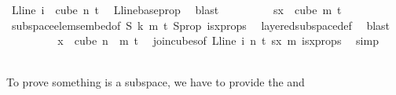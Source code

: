 \begin{isabellebody}
\ {\isachardoublequoteopen}L{\isacharunderscore}{\kern0pt}line\ i\ {\isasymin}\ cube\ n\ {\isacharparenleft}{\kern0pt}t{\isacharplus}{\kern0pt}{}{\isacharparenright}{\kern0pt}{\isachardoublequoteclose}\ \isamarkupfalse%
\ L{\isacharunderscore}{\kern0pt}line{\isacharunderscore}{\kern0pt}base{\isacharunderscore}{\kern0pt}prop\ \isamarkupfalse%
\ blast\isanewline
\ \ \ \ \ \ \isamarkupfalse%
\ \isamarkupfalse%
\ {\isachardoublequoteopen}sx\ {\isasymin}\ cube\ m\ {\isacharparenleft}{\kern0pt}t{\isacharplus}{\kern0pt}{}{\isacharparenright}{\kern0pt}{\isachardoublequoteclose}\ \isanewline
\ \ \ \ \ \ \ \ \isamarkupfalse%
\ subspace{\isacharunderscore}{\kern0pt}elems{\isacharunderscore}{\kern0pt}embed{\isacharbrackleft}{\kern0pt}of\ {\isachardoublequoteopen}S{\isachardoublequoteclose}\ {\isachardoublequoteopen}k{\isachardoublequoteclose}\ {\isachardoublequoteopen}m{\isachardoublequoteclose}\ {\isachardoublequoteopen}t{\isacharplus}{\kern0pt}{}{\isachardoublequoteclose}{\isacharbrackright}{\kern0pt}\ S{\isacharunderscore}{\kern0pt}prop\ isx{\isacharunderscore}{\kern0pt}props\ \isamarkupfalse%
\ layered{\isacharunderscore}{\kern0pt}subspace{\isacharunderscore}{\kern0pt}def\ \isamarkupfalse%
\ blast\isanewline
\ \ \ \ \ \ \isamarkupfalse%
\ \isamarkupfalse%
\ {\isachardoublequoteopen}x\ {\isasymin}\ cube\ {\isacharparenleft}{\kern0pt}n\ {\isacharplus}{\kern0pt}\ m{\isacharparenright}{\kern0pt}\ {\isacharparenleft}{\kern0pt}t{\isacharplus}{\kern0pt}{}{\isacharparenright}{\kern0pt}{\isachardoublequoteclose}\ \isamarkupfalse%
\ join{\isacharunderscore}{\kern0pt}cubes{\isacharbrackleft}{\kern0pt}of\ {\isachardoublequoteopen}L{\isacharunderscore}{\kern0pt}line\ i{\isachardoublequoteclose}\ {\isachardoublequoteopen}n{\isachardoublequoteclose}\ {\isachardoublequoteopen}t{\isachardoublequoteclose}\ sx\ m{\isacharbrackright}{\kern0pt}\ isx{\isacharunderscore}{\kern0pt}props\ \isamarkupfalse%
\ simp\ \isanewline
\ \ \ \ \isamarkupfalse%
%
\endisatagproof
{\isafoldproof}%
%
\isadelimproof
%
\endisadelimproof
%
\isadelimdocument
%
\endisadelimdocument
%
\isatagdocument
%
\isamarkuptrue%
%
\begin{isamarkuptext}%
To prove something is a subspace, we have to provide the  and 

\end{isamarkuptext}
\end{isabellebody}
